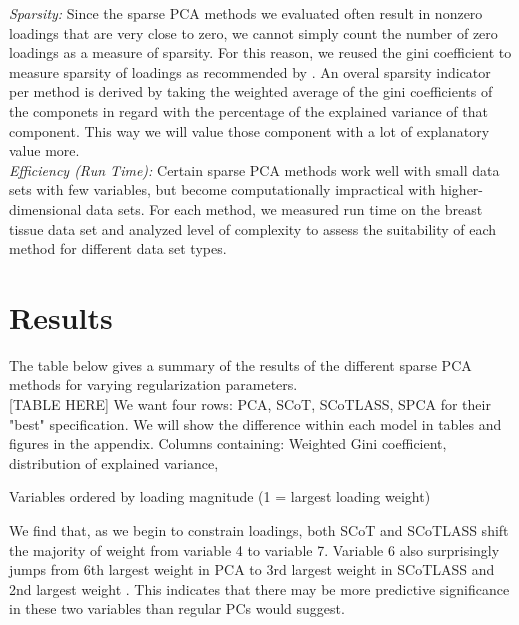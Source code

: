 \documentclass[11pt,letterpaper]{report}
\begin{document}
\textit{Sparsity:} Since the sparse PCA methods we evaluated often result in nonzero loadings that are very close to zero, we cannot simply count the number of zero loadings as a measure of sparsity. For this reason, we reused the gini coefficient to measure sparsity of loadings as recommended by . An overal sparsity indicator per method is derived by taking the weighted average of the gini coefficients of the componets in regard with the percentage of the explained variance of that component. This way we will value those component with a lot of explanatory value more.\\

\textit{Efficiency (Run Time):} Certain sparse PCA methods work well with small data sets with few variables, but become computationally impractical with higher-dimensional data sets. For each method, we measured run time on the breast tissue data set and analyzed level of complexity to assess the suitability of each method for different data set types.

\section*{Results}

The table below gives a summary of the results of the different sparse PCA methods for varying regularization parameters.\\

{\color{red}[TABLE HERE]
We want four rows: PCA, SCoT, SCoTLASS, SPCA for their "best" specification. We will show the difference within each model in tables and figures in the appendix. Columns containing: Weighted Gini coefficient, distribution of explained variance, }
\\

\begin{table}[htpb!]
    \centering
    \caption{Variables ordered by loading magnitude (1 = largest loading weight)}
    \label{rstl:loadings}
    
\end{table}


We find that, as we begin to constrain loadings, both SCoT and SCoTLASS shift the majority of weight from variable 4 to variable 7. Variable 6 also surprisingly jumps from 6th largest weight in PCA to 3rd largest weight in SCoTLASS and 2nd largest weight . This indicates that there may be more predictive significance in these two variables than regular PCs would suggest. \\
\end{document}
